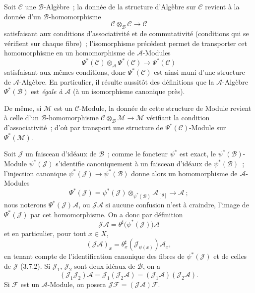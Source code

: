 \begin{env}[4.3.4]
\label{0.4.3.4-fr}
Soit $\mathcal{C}$ une $\mathcal{B}$-Algèbre~; la donnée de la structure
d'Algèbre sur $\mathcal{C}$ revient à la donnée d'un $\mathcal{B}$-homomorphisme
\[
  \mathcal{C}\otimes_{\mathcal{B}}\mathcal{C}\longrightarrow\mathcal{C}
\]
satisfaisant aux conditions d'associativité et de commutativité (conditions
qui se vérifient sur chaque fibre)~; l'isomorphisme précédent permet de
transporter cet homomorphisme en un homomorphisme de $\mathcal{A}$-Modules
\[
  \Psi^*(\mathcal{C})\otimes_{\mathcal{A}}\Psi^*(\mathcal{C})
  \longrightarrow\Psi^*(\mathcal{C})
\]
satisfaisant aux mêmes conditions, donc $\Psi^*(\mathcal{C})$ est ainsi muni
d'une structure de $\mathcal{A}$-Algèbre. En particulier, il résulte aussitôt
des définitions que la $\mathcal{A}$-Algèbre $\Psi^*(\mathcal{B})$ est \emph{égale à}
$\mathcal{A}$ (à un isomorphisme canonique près).

De même, si $\mathcal{M}$ est un $\mathcal{C}$-Module, la donnée de cette
structure de Module revient
à celle d'un $\mathcal{B}$-homomorphisme
$\mathcal{C}\otimes_{\mathcal{B}}\mathcal{M}\to\mathcal{M}$ vérifiant la
condition d'associativité~; d'où par transport une structure de
$\Psi^*(\mathcal{C})$-Module sur $\Psi^*(\mathcal{M})$.
\end{env}

\begin{env}[4.3.5]
\label{0.4.3.5-fr}
Soit $\mathcal{J}$ un faisceau d'idéaux de $\mathcal{B}$~; comme le foncteur
$\psi^*$ est exact, le $\psi^*(\mathcal{B})$-Module $\psi^*(\mathcal{J})$
s'identifie canoniquement à un faisceau d'idéaux de $\psi^*(\mathcal{B})$~;
l'injection canonique $\psi^*(\mathcal{J})\to\psi^*(\mathcal{B})$ donne alors
un homomorphisme de $\mathcal{A}$-Modules
\[
  \Psi^*(\mathcal{J})
  =\psi^*(\mathcal{J})\otimes_{\psi^*(\mathcal{B})}\mathcal{A}_{[\theta]}
  \longrightarrow\mathcal{A}~;
\]
nous noterons $\Psi^*(\mathcal{J})\mathcal{A}$, ou
$\mathcal{J}\mathcal{A}$ si aucune confusion n'est à craindre, l'image de
$\Psi^*(\mathcal{J})$ par cet homomorphisme. On a donc par définition
\[
  \mathcal{J}\mathcal{A}
  =\theta^\sharp\bigl(\psi^*(\mathcal{J})\bigr)\mathcal{A}
\]
et en particulier, pour tout $x\in X$,
\[
  (\mathcal{J}\mathcal{A})_x
  =\theta_x^\sharp(\mathcal{J}_{\psi(x)})\mathcal{A}_x,
\]
en tenant compte de l'identification canonique des fibres de
$\psi^*(\mathcal{J})$ et de celles de $\mathcal{J}$ (3.7.2). Si
$\mathcal{J}_1$, $\mathcal{J}_2$ sont deux idéaux de $\mathcal{B}$, on a
\[
  (\mathcal{J}_1\mathcal{J}_2)\mathcal{A}
  =\mathcal{J}_1(\mathcal{J}_2\mathcal{A})
  =(\mathcal{J}_1\mathcal{A})(\mathcal{J}_2\mathcal{A}).
\]
Si $\mathcal{F}$ est un $\mathcal{A}$-Module, on posera
$\mathcal{J}\mathcal{F}=(\mathcal{J}\mathcal{A})\mathcal{F}$.
\end{env}

